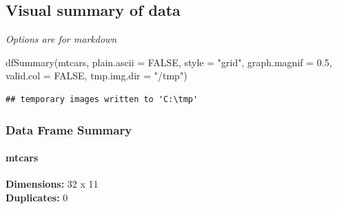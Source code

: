 \documentclass[
]{article}
\newenvironment{Shaded}{\begin{snugshade}}{\end{snugshade}}
\newcommand{\AttributeTok}[1]{\textcolor[rgb]{0.77,0.63,0.00}{#1}}
\newcommand{\ConstantTok}[1]{\textcolor[rgb]{0.00,0.00,0.00}{#1}}
\newcommand{\FloatTok}[1]{\textcolor[rgb]{0.00,0.00,0.81}{#1}}
\newcommand{\FunctionTok}[1]{\textcolor[rgb]{0.00,0.00,0.00}{#1}}
\newcommand{\NormalTok}[1]{#1}
\newcommand{\StringTok}[1]{\textcolor[rgb]{0.31,0.60,0.02}{#1}}
\begin{document}
\hypertarget{visual-summary-of-data}{%
\subsection{Visual summary of data}\label{visual-summary-of-data}}

\emph{Options are for markdown}

\begin{Shaded}
\begin{Highlighting}[]
\FunctionTok{dfSummary}\NormalTok{(mtcars, }\AttributeTok{plain.ascii =} \ConstantTok{FALSE}\NormalTok{, }\AttributeTok{style =} \StringTok{"grid"}\NormalTok{, }
          \AttributeTok{graph.magnif =} \FloatTok{0.5}\NormalTok{, }\AttributeTok{valid.col =} \ConstantTok{FALSE}\NormalTok{, }\AttributeTok{tmp.img.dir =} \StringTok{"/tmp"}\NormalTok{)}
\end{Highlighting}
\end{Shaded}

\begin{verbatim}
## temporary images written to 'C:\tmp'
\end{verbatim}

\hypertarget{data-frame-summary}{%
\subsubsection{Data Frame Summary}\label{data-frame-summary}}

\hypertarget{mtcars}{%
\paragraph{mtcars}\label{mtcars}}

\textbf{Dimensions:} 32 x 11\\
\textbf{Duplicates:} 0
\end{document}
